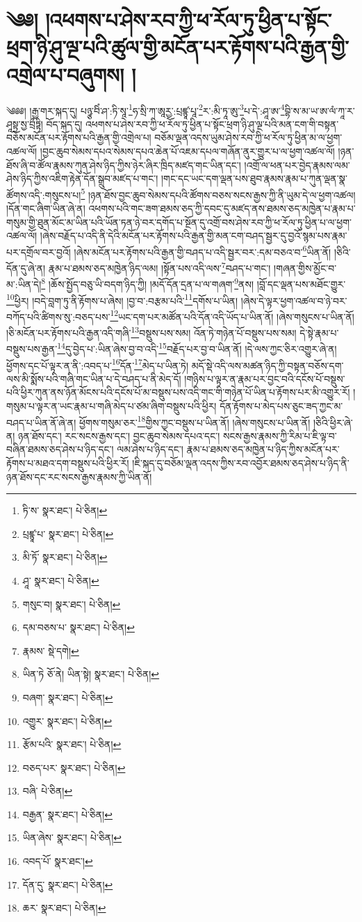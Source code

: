 \setcounter{footnote}{0} 
\chapter{༄༅། །འཕགས་པ་ཤེས་རབ་ཀྱི་ཕ་རོལ་ཏུ་ཕྱིན་པ་སྟོང་ཕྲག་ཉི་ཤུ་ལྔ་པའི་ཚུལ་གྱི་མངོན་པར་རྟོགས་པའི་རྒྱན་གྱི་འགྲེལ་པ་བཞུགས། །}༄༅༅། །རྒྱ་གར་སྐད་དུ། པཉྩ་བིཾ་ཤ་:ཏི་སཱ་\footnote{ཏི་ས་  སྣར་ཐང་།  པེ་ཅིན། }ཧ་སྲི་ཀ་ཨཱརྱ་:པྲཛྙཱ་པཱ་\footnote{པྲཛྙཱ་པ་  སྣར་ཐང་།  པེ་ཅིན། }ར་:མི་ཏཱ་ཨུ་\footnote{མི་ཏོ་  སྣར་ཐང་།  པེ་ཅིན། }པ་དེ་:ཤཱ་ཨ་\footnote{ཤཱ་  སྣར་ཐང་།  པེ་ཅིན། }བྷི་ས་མ་ཡ་ཨ་ལཾ་ཀཱ་ར་ཤཱསྟྲ་སྱ་བྲྀཏྟི། བོད་སྐད་དུ། འཕགས་པ་ཤེས་རབ་ཀྱི་ཕ་རོལ་ཏུ་ཕྱིན་པ་སྟོང་ཕྲག་ཉི་ཤུ་ལྔ་པའི་མན་ངག་གི་བསྟན་བཅོས་མངོན་པར་རྟོགས་པའི་རྒྱན་གྱི་འགྲེལ་པ། བཅོམ་ལྡན་འདས་ཡུམ་ཤེས་རབ་ཀྱི་ཕ་རོལ་ཏུ་ཕྱིན་མ་ལ་ཕྱག་འཚལ་ལོ། །བྱང་ཆུབ་སེམས་དཔའ་སེམས་དཔའ་ཆེན་པོ་འཇམ་དཔལ་གཞོན་ནུར་གྱུར་པ་ལ་ཕྱག་འཚལ་ལོ། །ཉན་ཐོས་ཞི་བ་ཚོལ་རྣམས་ཀུན་ཤེས་ཉིད་ཀྱིས་ཉེར་ཞིར་ཁྲིད་མཛད་གང་ཡིན་དང་། །འགྲོ་ལ་ཕན་པར་བྱེད་རྣམས་ལམ་ཤེས་ཉིད་ཀྱིས་འཇིག་རྟེན་དོན་སྒྲུབ་མཛད་པ་གང་། །གང་དང་ཡང་དག་ལྡན་པས་ཐུབ་རྣམས་རྣམ་པ་ཀུན་ལྡན་སྣ་ཚོགས་འདི་:གསུངས་པ།\footnote{གསུང་བ།  སྣར་ཐང་།  པེ་ཅིན། } །ཉན་ཐོས་བྱང་ཆུབ་སེམས་དཔའི་ཚོགས་བཅས་སངས་རྒྱས་ཀྱི་ནི་ཡུམ་དེ་ལ་ཕྱག་འཚལ། །དོན་གང་ཞིག་ཡིན་ཞེ་ན། འཕགས་པའི་གང་ཟག་ཐམས་ཅད་ཀྱི་དབང་དུ་མཛད་ནས་ཐམས་ཅད་མཁྱེན་པ་རྣམ་པ་གསུམ་གྱི་ཐུན་མོང་མ་ཡིན་པའི་ཡོན་ཏན་ཉེ་བར་དགོད་པ་སྔོན་དུ་འགྲོ་བས་ཤེས་རབ་ཀྱི་ཕ་རོལ་ཏུ་ཕྱིན་པ་ལ་ཕྱག་འཚལ་ལོ། །ཞེས་བརྗོད་པ་འདི་ནི་དེའི་མངོན་པར་རྟོགས་པའི་རྒྱན་གྱི་མན་ངག་བཤད་སྦྱར་དུ་བྱའོ་སྙམ་པས་རྣམ་པར་དགྲོལ་བར་བྱའོ། །ཞེས་མངོན་པར་རྟོགས་པའི་རྒྱན་གྱི་བཤད་པ་འདི་སྦྱར་བར་:དམ་བཅའ་བ་\footnote{དམ་བཅས་པ་  སྣར་ཐང་།  པེ་ཅིན། }ཡིན་ནོ། །ཅིའི་དོན་དུ་ཞེ་ན། རྣམ་པ་ཐམས་ཅད་མཁྱེན་ཉིད་ལམ། །སྟོན་པས་འདི་ལས་\footnote{རྣམས་  སྡེ་དགེ། }བཤད་པ་གང་། །གཞན་གྱིས་མྱོང་བ་མ་:ཡིན་དེ།\footnote{ཡིན་ཏེ  ཅོ་ནེ། ཡིན་སྟེ།  སྣར་ཐང་།  པེ་ཅིན། } །ཆོས་སྤྱོད་བཅུ་ཡི་བདག་ཉིད་ཀྱི། །མདོ་དོན་དྲན་པ་ལ་གཞག་\footnote{བཞག་  སྣར་ཐང་།  པེ་ཅིན། }ནས། །བློ་དང་ལྡན་པས་མཐོང་གྱུར་\footnote{འགྱུར་  སྣར་ཐང་།  པེ་ཅིན། }ཕྱིར། །བདེ་བླག་ཏུ་ནི་རྟོགས་པ་ཞེས། །བྱ་བ་:བརྩམ་པའི་\footnote{རྩོམ་པའི་  སྣར་ཐང་།  པེ་ཅིན། }དགོས་པ་ཡིན། །ཞེས་དེ་ལྟར་ཕྱག་འཚལ་བ་ཉེ་བར་བཀོད་པའི་ཚིགས་སུ་:བཅད་པས་\footnote{བཅད་པར་  སྣར་ཐང་།  པེ་ཅིན། }ཡང་དག་པར་མཚོན་པའི་དོན་འདི་ཡོད་པ་ཡིན་ནོ། །ཞེས་གསུངས་པ་ཡིན་ནོ། །ཅི་མངོན་པར་རྟོགས་པའི་རྒྱན་འདི་གཞི་\footnote{བཞི་  པེ་ཅིན། }བསྡུས་པས་སམ། འོན་ཏེ་གཉེན་པོ་བསྡུས་པས་སམ། དེ་སྟེ་རྣམ་པ་བསྡུས་པས་རྒྱན་\footnote{བརྒྱན་  སྣར་ཐང་།  པེ་ཅིན། }དུ་བྱེད་པ་:ཡིན་ཞེས་བྱ་བ་འདི་\footnote{ཡིན་ཞེས་  སྣར་ཐང་།  པེ་ཅིན། }བརྗོད་པར་བྱ་བ་ཡིན་ནོ། །དེ་ལས་ཀྱང་ཅིར་འགྱུར་ཞེ་ན། ཕྱོགས་དང་པོ་ལྟར་ན་ནི་:འབད་པ་\footnote{འབད་པོ་  སྣར་ཐང་། }དོན་\footnote{དོན་དུ་  སྣར་ཐང་།  པེ་ཅིན། }མེད་པ་ཡིན་ཏེ། མདོ་སྡེ་འདི་ལས་མཚན་ཉིད་ཀྱི་བསྟན་བཅོས་དག་ལས་མི་སྨོས་པའི་གཞི་གང་ཡིན་པ་དེ་བཤད་པ་ནི་མེད་དོ། །གཉིས་པ་ལྟར་ན་རྣམ་པར་བྱང་བའི་དངོས་པོ་བསྡུས་པའི་ཕྱིར་ཀུན་ནས་ཉོན་མོངས་པའི་དངོས་པོ་མ་བསྡུས་པས་འདི་གང་གི་གཉེན་པོ་ཡིན་པ་རྟོགས་པར་མི་འགྱུར་རོ། །གསུམ་པ་ལྟར་ན་ཡང་རྣམ་པ་གཞི་མེད་པ་ཙམ་ཞིག་བསྡུས་པའི་ཕྱིར། དོན་རྟོགས་པ་མེད་པས་ཅུང་ཟད་ཀྱང་མ་བཤད་པ་ཡིན་ནོ་ཞེ་ན། ཕྱོགས་གསུམ་ཅར་\footnote{ཆར་  སྣར་ཐང་།  པེ་ཅིན། }གྱིས་ཀྱང་བསྡུས་པ་ཡིན་ནོ། །ཞེས་གསུངས་པ་ཡིན་ནོ། །ཅིའི་ཕྱིར་ཞེ་ན། ཉན་ཐོས་དང་། རང་སངས་རྒྱས་དང་། བྱང་ཆུབ་སེམས་དཔའ་དང་། སངས་རྒྱས་རྣམས་ཀྱི་རིམ་པ་ཇི་ལྟ་བ་བཞིན་ཐམས་ཅད་ཤེས་པ་ཉིད་དང་། ལམ་ཤེས་པ་ཉིད་དང་། རྣམ་པ་ཐམས་ཅད་མཁྱེན་པ་ཉིད་ཀྱིས་མངོན་པར་རྟོགས་པ་མཐའ་དག་བསྡུས་པའི་ཕྱིར་རོ། །ཇི་སྐད་དུ་བཅོམ་ལྡན་འདས་ཀྱིས་རབ་འབྱོར་ཐམས་ཅད་ཤེས་པ་ཉིད་ནི་ཉན་ཐོས་དང་རང་སངས་རྒྱས་རྣམས་ཀྱི་ཡིན་ནོ། 